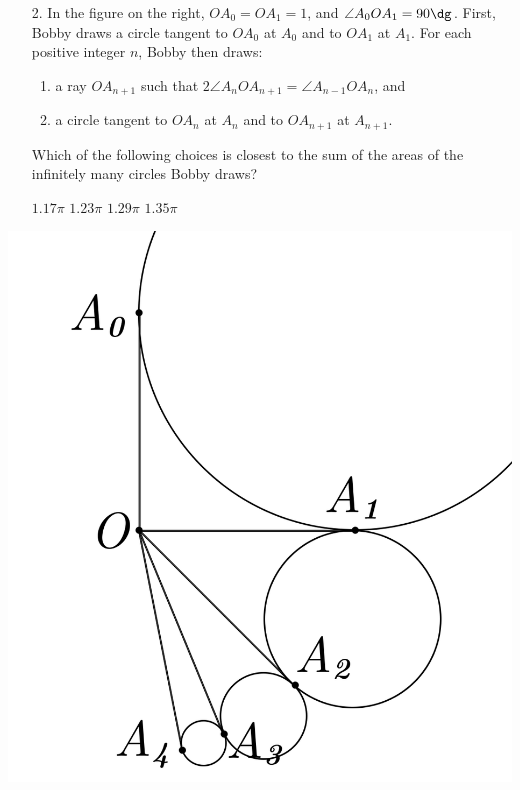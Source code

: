 \documentclass[11pt,paper=letter]{scrartcl}
\begin{document}
\noindent
\begin{minipage}{0.75\textwidth}
  \begin{enumerate}
    \item[2.] In the figure on the right, $OA_0 = OA_1 = 1$, and $\angle A_0OA_1 = 90\dg$. First, Bobby draws a circle tangent to $OA_0$ at $A_0$ and to $OA_1$ at $A_1$. For each positive integer $n$, Bobby then draws:
    \begin{enumerate}
       \item a ray $OA_{n+1}$ such that $2\angle A_nOA_{n+1} = \angle A_{n-1}OA_n$, and
       \item a circle tangent to $OA_n$ at $A_n$ and to $OA_{n+1}$ at $A_{n+1}$.
    \end{enumerate}
    Which of the following choices is closest to the sum of the areas of the infinitely many circles Bobby draws?

  \fourch
  {$1.17\pi$}
  {$1.23\pi$}
  {$1.29\pi$}
  {$1.35\pi$}
  \end{enumerate}
\end{minipage}%
\begin{minipage}{0.25\textwidth}
  \begin{center}
    \includegraphics[width=\textwidth]{f2.png}
  \end{center}
\end{minipage}%
\end{document}
